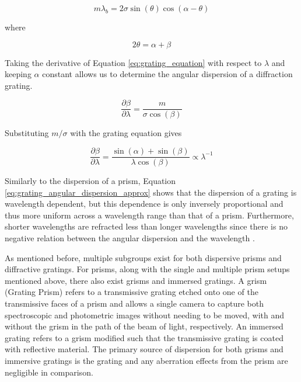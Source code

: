 \begin{equation}
	m\lambda_{b} = 2\sigma\sin(\theta)\cos(\alpha - \theta)
    \label{eq:blaze_wavelength}
\end{equation}

\noindent where

\begin{equation}
    2\theta = \alpha + \beta
\end{equation}

Taking the derivative of Equation \ref{eq:grating_equation} with respect to $\lambda$ and keeping $\alpha$ constant allows us to determine the angular dispersion of a diffraction grating.

\begin{equation}
    \frac{\partial \beta}{\partial \lambda} = \frac{m}{\sigma \cos(\beta)}
    \label{eq:grating_angular_dispersion}
\end{equation}

\noindent Substituting $m / \sigma$ with the grating equation gives

\begin{equation}
    \frac{\partial \beta}{\partial \lambda} = \frac{\sin(\alpha) + \sin(\beta)}{\lambda \cos(\beta)} \propto \lambda^{-1}
    \label{eq:grating_angular_dispersion_approx}
\end{equation}

Similarly to the dispersion of a prism, Equation \ref{eq:grating_angular_dispersion_approx} shows that the dispersion of a grating is wavelength dependent, but this dependence is only inversely proportional and thus more uniform across a wavelength range than that of a prism. Furthermore, shorter wavelengths are refracted less than longer wavelengths since there is no negative relation between the angular dispersion and the wavelength \citep{BirneyObsAstro, Hecht_optics}.
\prgph

As mentioned before, multiple subgroups exist for both dispersive prisms and diffractive gratings. For prisms, along with the single and multiple prism setups mentioned above, there also exist grisms and immersed gratings. A grism (Grating Prism) refers to a transmissive grating etched onto one of the transmissive faces of a prism and allows a single camera to capture both spectroscopic and photometric images without needing to be moved, with and without the grism in the path of the beam of light, respectively. An immersed grating refers to a grism modified such that the transmissive grating is coated with reflective material. The primary source of dispersion for both grisms and immersive gratings is the grating and any aberration effects from the prism are negligible in comparison.
\prgph

